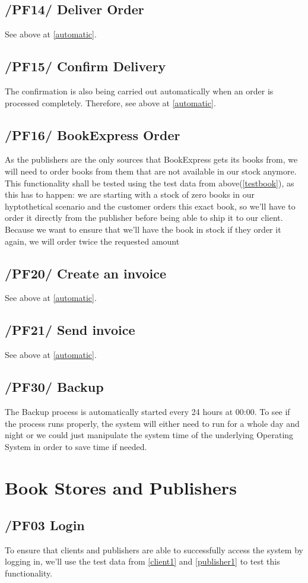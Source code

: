 \documentclass[11pt,a4paper,oneside,svgnames]{report}
\begin{document}
\subsection{/PF14/ Deliver Order}
See above at \ref{automatic}.
\subsection{/PF15/ Confirm Delivery}
The confirmation is also being carried out automatically when an order is processed completely. Therefore, see above at \ref{automatic}.
\subsection{/PF16/ BookExpress Order}
As the publishers are the only sources that BookExpress gets its books from, we will need to order books from them that are not available in our stock anymore.
This functionality shall be tested using the test data from above(\ref{testbook}), as this has to happen: we are starting with a stock of zero books in our hyptothetical scenario and the customer orders this exact book, so we'll have to order it directly from the publisher before being able to ship it to our client.
Because we want to ensure that we'll have the book in stock if they order it again, we will order twice the requested amount
\subsection{/PF20/ Create an invoice}
See above at \ref{automatic}.
\subsection{/PF21/ Send invoice}
See above at \ref{automatic}.
\subsection{/PF30/ Backup}
The Backup process is automatically started every 24 hours at 00:00. To see if the process runs properly, the system will either need to run for a whole day and night or we could just manipulate the system time of the underlying Operating System in order to save time if needed.
\section{Book Stores and Publishers}
\subsection{/PF03 Login}
To ensure that clients and publishers are able to successfully access the system by logging in, we'll use the test data from \ref{client1} and \ref{publisher1} to test this functionality. 
\end{document}
